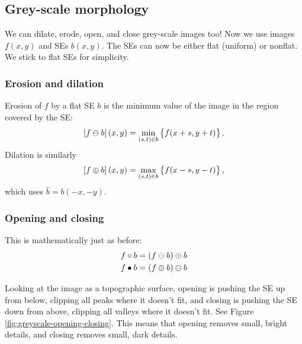 \subsection{Grey-scale morphology}
We can dilate, erode, open, and close grey-scale images too! Now we use images $f(x,y)$ and SEs $b(x,y)$. The SEs can now be either flat (uniform) or nonflat. We stick to flat SEs for simplicity.

\subsubsection{Erosion and dilation}
Erosion of $f$ by a flat SE $b$ is the minimum value of the image in the region covered by the SE:
\begin{equation}
    \left[ f \ominus b \right](x,y) = \min_{(s,t) \in b} \left\{ f(x+s, y+t) \right\}.
\end{equation}
Dilation is similarly
\begin{equation}
    \left[ f \oplus b \right](x,y) = \max_{(s,t) \in b}  \left\{ f(x-s, y-t) \right\},
\end{equation}
which uses  $\hat{b} = b(-x,-y)$.

\subsubsection{Opening and closing}\label{sssec:greyscale-open-close}
This is mathematically just as before:
\begin{subequations}
\begin{align}
    f \circ b = (f \ominus b) \oplus b \\
    f \bullet b = (f \oplus b) \ominus b
\end{align}
\end{subequations}

Looking at the image as a topographic surface, opening is pushing the SE up from below, clipping all peaks where it doesn't fit, and closing is pushing the SE down from above, clipping all valleys where it doesn't fit. See Figure \ref{fig:greyscale-opening-closing}. This means that opening removes small, bright details, and closing removes small, dark details.

